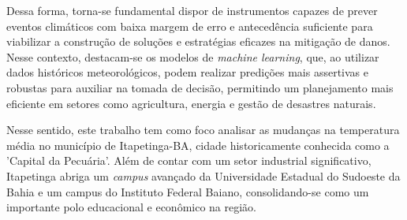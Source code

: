     
    Dessa forma, torna-se fundamental dispor de instrumentos capazes de prever eventos climáticos com baixa margem de erro 
    e antecedência suficiente para viabilizar a construção de soluções e estratégias eficazes na mitigação de danos. 
    Nesse contexto, destacam-se os modelos de \emph{machine learning}, que, ao utilizar dados históricos meteorológicos, podem 
    realizar predições mais assertivas e robustas para auxiliar na tomada de decisão, permitindo um 
    planejamento mais eficiente em setores como agricultura, energia e gestão de desastres naturais.
    
    Nesse sentido, este trabalho tem como foco analisar as mudanças na temperatura média no município de Itapetinga-BA, 
    cidade historicamente conhecida como a 'Capital da Pecuária'. Além de contar com um setor industrial 
    significativo, Itapetinga abriga um \textit{campus} avançado da Universidade Estadual do Sudoeste da Bahia e um campus 
    do Instituto Federal Baiano, consolidando-se como um importante polo educacional e econômico na região.


